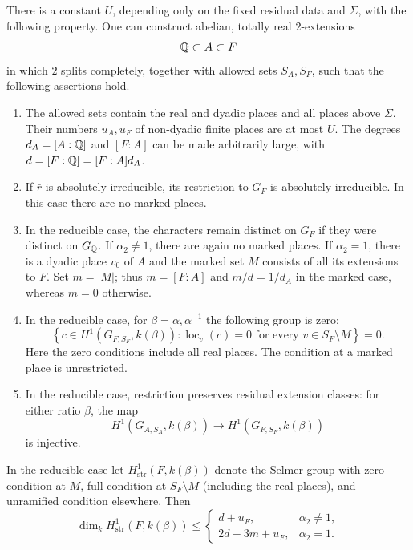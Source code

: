 \begin{proposition}\label{prop:field-preparation}
There is a constant $U$, depending only on the fixed residual data and
$\Sigma$, with the following property.  One can construct abelian,
totally real $2$-extensions
\[
                 \mathbb Q\subset A\subset F
\]
in which $2$ splits completely, together with allowed sets $S_A,S_F$,
such that the following assertions hold.
\begin{enumerate}
\item The allowed sets contain the real and dyadic places and all places
above $\Sigma$.  Their numbers $u_A,u_F$ of non-dyadic finite places
are at most $U$.  The degrees $d_A=[A:\mathbb Q]$ and $[F:A]$ can be
made arbitrarily large, with $d=[F:\mathbb Q]=[F:A]d_A$.
\item If $\bar r$ is absolutely irreducible, its restriction to $G_F$
is absolutely irreducible.  In this case there are no marked places.
\item In the reducible case, the characters remain distinct on $G_F$
if they were distinct on $G_{\mathbb Q}$.  If $\alpha_2\ne1$, there are
again no marked places.  If $\alpha_2=1$, there is a dyadic place
$v_0$ of $A$ and the marked set $M$ consists of all its extensions
to $F$.  Set $m=|M|$; thus $m=[F:A]$ and $m/d=1/d_A$ in the
marked case, whereas $m=0$ otherwise.
\item In the reducible case, for $\beta=\alpha,\alpha^{-1}$ the
following group is zero:
\begin{equation}\label{eq:dual-vanishing}
 \left\{c\in H^1(G_{F,S_F},k(\beta)):
       \operatorname{loc}_v(c)=0\text{ for every }v\in S_F\setminus M
 \right\}=0.
\end{equation}
Here the zero conditions include all real places.  The condition at a
marked place is unrestricted.
\item In the reducible case, restriction preserves residual extension
classes: for either ratio
$\beta$, the map
\[
 H^1(G_{A,S_A},k(\beta))\longrightarrow H^1(G_{F,S_F},k(\beta))
\]
is injective.
\end{enumerate}
In the reducible case let $H^1_{\mathrm{str}}(F,k(\beta))$ denote the
Selmer group with zero condition at $M$, full condition at
$S_F\setminus M$ (including the real places), and unramified condition
elsewhere.  Then
\begin{equation}\label{eq:strict-selmer}
 \dim_k H^1_{\mathrm{str}}(F,k(\beta))\le
 \begin{cases}
 d+u_F,&\alpha_2\ne1,\\
 2d-3m+u_F,&\alpha_2=1.
 \end{cases}
\end{equation}
\end{proposition}

